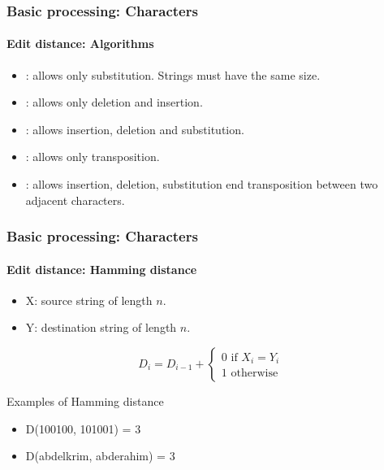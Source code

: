 \documentclass[xcolor=table]{beamer}
\begin{document}
\begin{frame}
\frametitle{Basic processing: Characters}
\framesubtitle{Edit distance: Algorithms}

\begin{itemize}
	\item {}: allows only substitution. Strings must have the same size. 
	\item {}: allows only deletion and insertion.
	\item {}: allows insertion, deletion and substitution.
	\item {}: allows only transposition.
	\item {}: allows insertion, deletion, substitution end transposition between two  adjacent characters.
\end{itemize}

\end{frame}


\begin{frame}
	\frametitle{Basic processing: Characters}
	\framesubtitle{Edit distance: Hamming distance}
	
	\begin{itemize}
		\item X: source string of length $n$.
		\item Y: destination string of length $n$.
	\end{itemize}
	
	\[
	D_{i} = D_{i-1} + 
	\begin{cases}
	0 \text{ if } X_i = Y_i\\
	1 \text{ otherwise}
	\end{cases}
	\]
	
	\begin{exampleblock}{Examples of Hamming distance}
		\begin{itemize}
			\item D(100100, 101001) = 3
			\item D(abdelkrim, abderahim) = 3
		\end{itemize}
	\end{exampleblock}
	
\end{frame}
\end{document}
